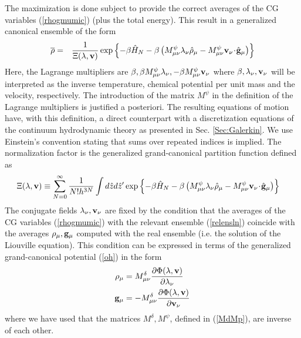 \documentclass[b5paper,openright,11pt]{book}
\newcommand{\esc}{\!\cdot\!}
\begin{document}
\begin{appendices}
The maximization is done
subject  to  provide   the  correct  averages  of   the  CG  variables
(\ref{rhogmumic})  (plus   the  total   energy).  This  result   in  a
generalized canonical ensemble of the form
\begin{eqnarray}
  \overline{\rho}&=&\frac{1}{\Xi(\lambda,{\bf v})}\exp\left\{-\beta \hat{H}_N
-\beta\left(M^\psi_{\mu\nu}\lambda_\nu \hat{\rho}_{\mu}
-M^\psi_{\mu\nu}{\bf v}_\nu\esc\hat{\bf g}_{\mu}\right)\right\}
\label{relensln}
\end{eqnarray}
Here,      the     Lagrange      multipliers     are      $\beta,\beta
M^\psi_{\mu\nu}\lambda_\nu,-\beta  M^\psi_{\mu\nu}{\bf   v}_\nu$  where
$\beta, \lambda_\nu,{\bf  v}_\nu$ will  be interpreted as  the inverse
temperature,  chemical  potential  per  unit mass  and  the  velocity,
respectively.
The introduction of the matrix $M^\psi$ in the definition of the Lagrange multipliers is justified a posteriori. 
The resulting equations of motion have, with this definition, a direct counterpart with a discretization equations of the continuum hydrodynamic theory as presented in Sec. \ref{Sec:Galerkin}.
We use Einstein’s convention stating that sums over repeated indices is implied.
The   normalization   factor   is   the   generalized
grand-canonical partition function defined as
\begin{align}
&\Xi(\lambda,{\bf v})\equiv \sum_{N=0}^\infty \frac{1}{N!h^{3N}}
  \int d\hat{z}d\hat{z}'
\exp\left\{-\beta \hat{H}_N-\beta\left( M^\psi_{\mu\nu}\lambda_\nu\hat{\rho}_{\mu}
-M^\psi_{\mu\nu}{\bf v}_\nu\esc\hat{\bf g}_{\mu}\right)\right\}
\label{xiln0}
\end{align}
The  conjugate  fields  $\lambda_\nu,{\bf  v}_\nu$ are  fixed  by  the
condition that the averages of the CG variables (\ref{rhogmumic}) with
the  relevant ensemble  (\ref{relensln})  coincide  with the  averages
$\rho_\mu,{\bf g}_\mu$ computed with the  real ensemble (i.e. the
solution of the Liouville equation). This condition can be expressed in terms of
the generalized grand-canonical potential (\ref{oh})
in the form
\begin{align}
  \rho_\mu &=M^\delta_{\mu\nu}\frac{\partial \Phi(\lambda,{\bf v})}{\partial \lambda_\nu }
\nonumber\\
  {\bf g}_\mu &=-M^\delta_{\mu\nu}\frac{\partial \Phi(\lambda,{\bf v})}{\partial {\bf v}_\nu }
\label{rgo}
\end{align}
where we have used that the matrices $M^\delta, M^\psi$, defined in (\ref{MdMp}), are inverse of
each other.  


\end{appendices}
\end{document}
